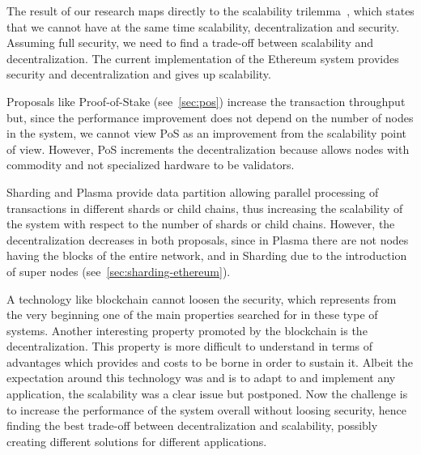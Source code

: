 The result of our research maps directly to the scalability
trilemma~\cite{bib:sharding-faq}, which states that we cannot have at the same
time scalability, decentralization and security. Assuming full security, we need
to find a trade-off between scalability and decentralization. The current
implementation of the Ethereum system provides security and decentralization and
gives up scalability.

Proposals like Proof-of-Stake (see~\autoref{sec:pos}) increase the transaction
throughput but, since the performance improvement does not depend on the number
of nodes in the system, we cannot view PoS as an improvement from the
scalability point of view. However, PoS increments the decentralization because
allows nodes with commodity and not specialized hardware to be validators.

Sharding and Plasma provide data partition allowing parallel processing of
transactions in different shards or child chains, thus increasing the
scalability of the system with respect to the number of shards or child chains.
However, the decentralization decreases in both proposals, since in Plasma there
are not nodes having the blocks of the entire network, and in Sharding due to
the introduction of super nodes (see~\autoref{sec:sharding-ethereum}).

A technology like blockchain cannot loosen the security, which represents from
the very beginning one of the main properties searched for in these type of
systems. Another interesting property promoted by the blockchain is the
decentralization. This property is more difficult to understand in terms of
advantages which provides and costs to be borne in order to sustain it. Albeit
the expectation around this technology was and is to adapt to and implement any
application, the scalability was a clear issue but postponed. Now the challenge
is to increase the performance of the system overall without loosing security,
hence finding the best trade-off between decentralization and scalability,
possibly creating different solutions for different applications.
